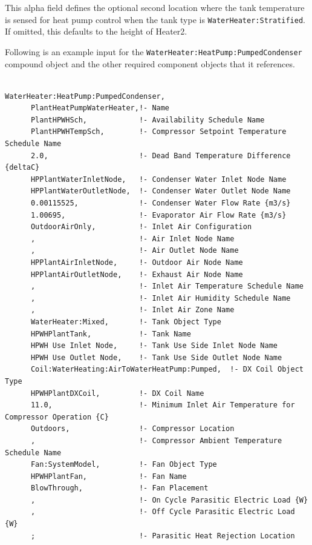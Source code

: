 This alpha field defines the optional second location where the tank temperature is sensed for heat pump control when the tank type is \lstinline!WaterHeater:Stratified!. If omitted, this defaults to the height of Heater2.

Following is an example input for the \lstinline!WaterHeater:HeatPump:PumpedCondenser! compound object and the other required component objects that it references.

\begin{lstlisting}

WaterHeater:HeatPump:PumpedCondenser,
      PlantHeatPumpWaterHeater,!- Name
      PlantHPWHSch,            !- Availability Schedule Name
      PlantHPWHTempSch,        !- Compressor Setpoint Temperature Schedule Name
      2.0,                     !- Dead Band Temperature Difference {deltaC}
      HPPlantWaterInletNode,   !- Condenser Water Inlet Node Name
      HPPlantWaterOutletNode,  !- Condenser Water Outlet Node Name
      0.00115525,              !- Condenser Water Flow Rate {m3/s}
      1.00695,                 !- Evaporator Air Flow Rate {m3/s}
      OutdoorAirOnly,          !- Inlet Air Configuration
      ,                        !- Air Inlet Node Name
      ,                        !- Air Outlet Node Name
      HPPlantAirInletNode,     !- Outdoor Air Node Name
      HPPlantAirOutletNode,    !- Exhaust Air Node Name
      ,                        !- Inlet Air Temperature Schedule Name
      ,                        !- Inlet Air Humidity Schedule Name
      ,                        !- Inlet Air Zone Name
      WaterHeater:Mixed,       !- Tank Object Type
      HPWHPlantTank,           !- Tank Name
      HPWH Use Inlet Node,     !- Tank Use Side Inlet Node Name
      HPWH Use Outlet Node,    !- Tank Use Side Outlet Node Name
      Coil:WaterHeating:AirToWaterHeatPump:Pumped,  !- DX Coil Object Type
      HPWHPlantDXCoil,         !- DX Coil Name
      11.0,                    !- Minimum Inlet Air Temperature for Compressor Operation {C}
      Outdoors,                !- Compressor Location
      ,                        !- Compressor Ambient Temperature Schedule Name
      Fan:SystemModel,         !- Fan Object Type
      HPWHPlantFan,            !- Fan Name
      BlowThrough,             !- Fan Placement
      ,                        !- On Cycle Parasitic Electric Load {W}
      ,                        !- Off Cycle Parasitic Electric Load {W}
      ;                        !- Parasitic Heat Rejection Location
\end{lstlisting}

